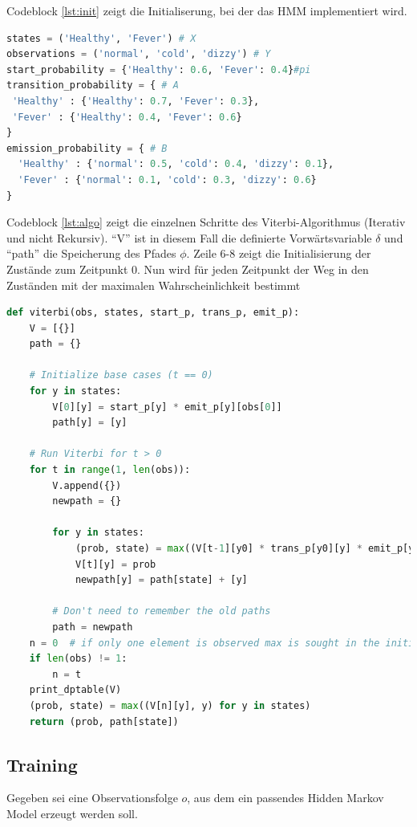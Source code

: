 Codeblock \ref{lst:init} zeigt die Initialiserung, bei der das HMM implementiert wird.
\begin{lstlisting}[language=Python,caption={Initialisierung},label=lst:init]
states = ('Healthy', 'Fever') # X
observations = ('normal', 'cold', 'dizzy') # Y
start_probability = {'Healthy': 0.6, 'Fever': 0.4}#pi
transition_probability = { # A
 'Healthy' : {'Healthy': 0.7, 'Fever': 0.3},
 'Fever' : {'Healthy': 0.4, 'Fever': 0.6}
}
emission_probability = { # B
  'Healthy' : {'normal': 0.5, 'cold': 0.4, 'dizzy': 0.1},
  'Fever' : {'normal': 0.1, 'cold': 0.3, 'dizzy': 0.6}
}
\end{lstlisting}

Codeblock \ref{lst:algo} zeigt die einzelnen Schritte des Viterbi-Algorithmus (Iterativ und nicht Rekursiv). ``V'' ist in diesem Fall die definierte Vorwärtsvariable $\delta$ und ``path'' die Speicherung des Pfades $\phi$. Zeile 6-8 zeigt die Initialisierung der Zustände zum Zeitpunkt 0. Nun wird für jeden Zeitpunkt der Weg in den Zuständen mit der maximalen Wahrscheinlichkeit bestimmt
\begin{lstlisting}[language=Python,caption={Viterbi-Algorithmus},label=lst:algo]
def viterbi(obs, states, start_p, trans_p, emit_p):
    V = [{}]
    path = {}
 
    # Initialize base cases (t == 0)
    for y in states:
        V[0][y] = start_p[y] * emit_p[y][obs[0]]
        path[y] = [y]
 
    # Run Viterbi for t > 0
    for t in range(1, len(obs)):
        V.append({})
        newpath = {}
 
        for y in states:
            (prob, state) = max((V[t-1][y0] * trans_p[y0][y] * emit_p[y][obs[t]], y0) for y0 in states)
            V[t][y] = prob
            newpath[y] = path[state] + [y]
 
        # Don't need to remember the old paths
        path = newpath
    n = 0  # if only one element is observed max is sought in the initialization values
    if len(obs) != 1:
        n = t
    print_dptable(V)
    (prob, state) = max((V[n][y], y) for y in states)
    return (prob, path[state])
\end{lstlisting}


\subsection{Training}
\label{sec:train}
Gegeben sei eine Observationsfolge $o$, aus dem ein passendes Hidden Markov Model erzeugt werden soll. 

